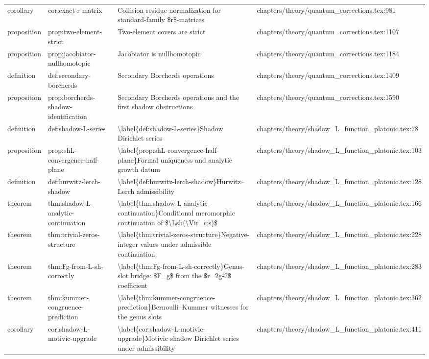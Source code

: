 \documentclass[11pt]{article}
\begin{document}
\begin{longtable}{L{0.10\textwidth}L{0.26\textwidth}L{0.42\textwidth}L{0.22\textwidth}}
corollary & cor:exact-r-matrix & Collision residue normalization for standard-family \$r\$-matrices & chapters/theory/quantum\_corrections.tex:981\\
proposition & prop:two-element-strict & Two-element covers are strict & chapters/theory/quantum\_corrections.tex:1107\\
proposition & prop:jacobiator-nullhomotopic & Jacobiator is nullhomotopic & chapters/theory/quantum\_corrections.tex:1184\\
definition & def:secondary-borcherds & Secondary Borcherds operations & chapters/theory/quantum\_corrections.tex:1409\\
proposition & prop:borcherds-shadow-identification & Secondary Borcherds operations and the first shadow obstructions & chapters/theory/quantum\_corrections.tex:1590\\
definition & def:shadow-L-series & \textbackslash{}label\{def:shadow-L-series\}Shadow Dirichlet series & chapters/theory/shadow\_L\_function\_platonic.tex:78\\
proposition & prop:shL-convergence-half-plane & \textbackslash{}label\{prop:shL-convergence-half-plane\}Formal uniqueness and analytic growth datum & chapters/theory/shadow\_L\_function\_platonic.tex:103\\
definition & def:hurwitz-lerch-shadow & \textbackslash{}label\{def:hurwitz-lerch-shadow\}Hurwitz--Lerch admissibility & chapters/theory/shadow\_L\_function\_platonic.tex:128\\
theorem & thm:shadow-L-analytic-continuation & \textbackslash{}label\{thm:shadow-L-analytic-continuation\}Cond{}itional meromorphic continuation of \$\textbackslash{}Lsh(\textbackslash{}Vir\_c;s)\$ & chapters/theory/shadow\_L\_function\_platonic.tex:166\\
theorem & thm:trivial-zeros-structure & \textbackslash{}label\{thm:trivial-zeros-structure\}Negative-integer values under admissible continuation & chapters/theory/shadow\_L\_function\_platonic.tex:228\\
theorem & thm:Fg-from-L-sh-correctly & \textbackslash{}label\{thm:Fg-from-L-sh-correctly\}Genus-slot bridge: \$F\_g\$ from the \$r=2g-2\$ coefficient & chapters/theory/shadow\_L\_function\_platonic.tex:283\\
theorem & thm:kummer-congruence-prediction & \textbackslash{}label\{thm:kummer-congruence-prediction\}Bernoulli--Kummer witnesses for the genus slots & chapters/theory/shadow\_L\_function\_platonic.tex:362\\
corollary & cor:shadow-L-motivic-upgrade & \textbackslash{}label\{cor:shadow-L-motivic-upgrade\}Motivic shadow Dirichlet series under admissibility & chapters/theory/shadow\_L\_function\_platonic.tex:411\\

\end{longtable}
\end{document}
